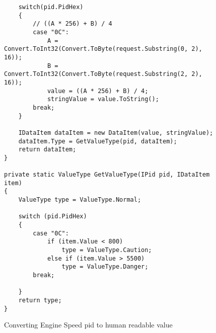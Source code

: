 {\begin{figure}[h]
\begin{lstlisting}
	switch(pid.PidHex)
	{
		// ((A * 256) + B) / 4
		case "0C":    
			A = Convert.ToInt32(Convert.ToByte(request.Substring(0, 2), 16));
			B = Convert.ToInt32(Convert.ToByte(request.Substring(2, 2), 16));
			value = ((A * 256) + B) / 4;
			stringValue = value.ToString();
		break;
	}

	IDataItem dataItem = new DataItem(value, stringValue);
	dataItem.Type = GetValueType(pid, dataItem);
    return dataItem;
}

private static ValueType GetValueType(IPid pid, IDataItem item)
{
	ValueType type = ValueType.Normal;
				
	switch (pid.PidHex)
	{
		case "0C":		
			if (item.Value < 800)
				type = ValueType.Caution;
			else if (item.Value > 5500)
				type = ValueType.Danger;
		break;

	}
	return type;
}
			\end{lstlisting}
			\caption{Converting Engine Speed pid to human readable value}
			\label{code:ConvertingPids}
		\end{figure}		
			
		\paragraph{}{
		}			
		
		\label{ssec:DataModuleDesc}
	}
